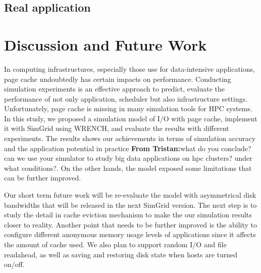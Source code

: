 \documentclass[conference]{IEEEtran}
\newcommand{\tristan}[1]{\color{orange}\textbf{From Tristan:}#1\color{black}}
\begin{document}
		\subsection{Real application}

	\section{Discussion and Future Work}
	\label{discussion}			
			In computing infrastructures, especially those use for data-intensive applications, 
			page cache undoubtedly has certain impacts on performance. 
			Conducting simulation experiments is an effective approach to predict, 
			evaluate the performance of not only application, scheduler but also 
			infrastructure settings. 
			Unfortunately, page cache is missing in many simulation tools for HPC systems. 
			In this study, we proposed a simulation model of I/O with page cache, 
			implement it with SimGrid using WRENCH, and evaluate the results 
			with different experiments. 
			The results shows our achievements in terms of simulation accuracy 
			and the application potential in practice \tristan{what do you conclude? can we use your simulator to study big data applications on hpc clusters? under what conditions?}. 
			On the other hands, the model exposed some limitations that can be 
			further improved.
			
			Our short term future work will be re-evaluate the model with asymmetrical 
			disk bandwidths that will be released in the next SimGrid version.
			The next step is to study the detail in cache eviction mechanism to make 
			the our simulation results closer to reality. 
			Another point that needs to be further improved is the ability to configure  
			different anonymous memory usage levels of applications since it affects  
			the amount of cache used.
			We also plan to support random I/O and file readahead, as well as 
			saving and restoring disk state when hosts are turned on/off.	 



\end{document}

